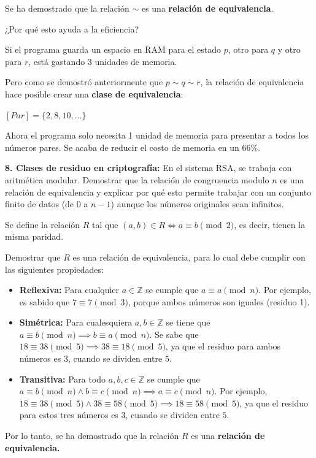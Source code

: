 \documentclass{article}
\begin{document}
Se ha demostrado que la relación $\sim$ es una \textbf{relación de equivalencia}.

¿Por qué esto ayuda a la eficiencia?

Si el programa guarda un espacio en RAM para el estado $p$, otro para $q$ y otro para $r$, está gastando 3 unidades de memoria.

Pero como se demostró anteriormente que $p \sim q \sim r$, la relación de equivalencia hace posible crear una \textbf{clase de equivalencia}:

$\left[Par\right] = \{2, 8, 10, ...\}$

Ahora el programa solo necesita 1 unidad de memoria para presentar a todos los números pares. Se acaba de reducir el costo de memoria en un $66\%$.

\textbf{8. Clases de residuo en criptografía:} En el sistema RSA, se trabaja con aritmética modular. Demostrar que la relación de congruencia modulo $n$ es una relación de equivalencia y explicar por qué esto permite trabajar con un conjunto finito de datos (de $0$ a $n - 1$) aunque los números originales sean infinitos.

Se define la relación $R$ tal que $(a, b) \in R \iff a \equiv b \pmod 2$, es decir, tienen la misma paridad.

Demostrar que $R$ es una relación de equivalencia, para lo cual debe cumplir con las siguientes propiedades:

\begin{itemize}
    \item \textbf{Reflexiva:} Para cualquier $a \in \mathbb{Z}$ se cumple que $a \equiv a \pmod n$. Por ejemplo, es sabido que $7 \equiv 7 \pmod 3$, porque ambos números son iguales (residuo 1).
    \item \textbf{Simétrica:} Para cualesquiera $a, b \in \mathbb{Z}$ se tiene que $a \equiv b \pmod n \implies b \equiv a \pmod n$. Se sabe que $18 \equiv 38 \pmod 5 \implies 38 \equiv 18 \pmod 5$, ya que el residuo para ambos números es $3$, cuando se dividen entre $5$.
    \item \textbf{Transitiva:} Para todo $a, b, c \in \mathbb{Z}$ se cumple que $a \equiv b \pmod n \land b \equiv c \pmod n \implies a \equiv c \pmod n$. Por ejemplo, $18 \equiv 38 \pmod 5 \land 38 \equiv 58 \pmod 5 \implies 18 \equiv 58 \pmod 5$, ya que el residuo para estos tres números es $3$, cuando se dividen entre $5$.
\end{itemize}

Por lo tanto, se ha demostrado que la relación $R$ es una \textbf{relación de equivalencia.}
\end{document}
